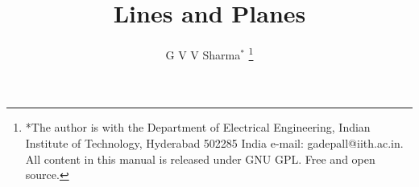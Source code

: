 \documentclass[journal,12pt,twocolumn]{IEEEtran}
\begin{document}
\let\StandardTheFigure\thefigure
\let\vec\mathbf
\renewcommand{\thefigure}{\theproblem}



\def\putbox#1#2#3{\makebox[0in][l]{\makebox[#1][l]{}\raisebox{\baselineskip}[0in][0in]{\raisebox{#2}[0in][0in]{#3}}}}
     \def\rightbox#1{\makebox[0in][r]{#1}}
     \def\centbox#1{\makebox[0in]{#1}}
     \def\topbox#1{\raisebox{-\baselineskip}[0in][0in]{#1}}
     \def\midbox#1{\raisebox{-0.5\baselineskip}[0in][0in]{#1}}

\vspace{3cm}

\title{
	Lines and Planes
}
\author{ G V V Sharma$^{*}$%
	\thanks{*The author is with the Department
		of Electrical Engineering, Indian Institute of Technology, Hyderabad
		502285 India e-mail:  gadepall@iith.ac.in. All content in this manual is released under GNU GPL.  Free and open source.}
	
}	


%
%
%

% 
%
\end{document}
